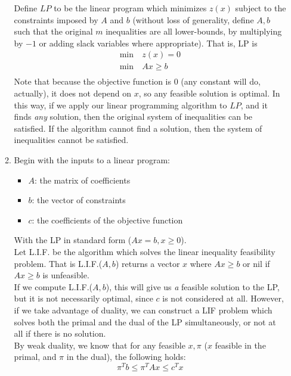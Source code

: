 \documentclass[12pt]{article}
\begin{document}
\begin{enumerate}
\begin{enumerate}
        Define $LP$ to be the linear program which minimizes $z(x)$ subject to
        the constraints imposed by $A$ and $b$ (without loss of generality,
        define $A,b$ such that the original $m$ inequalities are all
        lower-bounds, by multiplying by $-1$ or adding slack variables where
        appropriate). That is, LP is
        \begin{equation}
          \begin{split}
            \text{min}\ &z(x)=0\\
            \text{min}\ &Ax\geq b\\
          \end{split}
        \end{equation}
        Note that because the objective function is 0 (any constant will do,
        actually), it does not depend on $x$, so any feasible solution is
        optimal. In this way, if we apply our linear programming algorithm to
        $LP$, and it finds \textit{any} solution, then the original system of
        inequalities can be satisfied. If the algorithm cannot find a solution,
        then the system of inequalities cannot be satisfied.
      \item
        Begin with the inputs to a linear program:
          \begin{itemize}
            \item $A$: the matrix of coefficients
            \item $b$: the vector of constraints
            \item $c$: the coefficients of the objective function
          \end{itemize}
        With the LP in standard form ($Ax=b, x\geq0$).\\

        Let L.I.F. be the algorithm which solves the linear inequality
        feasibility problem. That is L.I.F.($A, b$) returns a vector $x$
        where $Ax\geq b$ or nil if $Ax\geq b$ is unfeasible.\\

        If we compute L.I.F.($A, b$), this will give us \textit{a} feasible
        solution to the LP, but it is not necessarily optimal, since $c$ is not
        considered at all. However, if we take advantage of duality, we can
        construct a LIF problem which solves both the primal and the dual of
        the LP simultaneously, or not at all if there is no solution.\\

        By weak duality, we know that for any feasible $x,\pi$ ($x$ feasible
        in the primal, and $\pi$ in the dual), the following holds:
        \begin{equation}
          \pi^Tb\leq\pi^TAx\leq c^Tx
        \end{equation}


\end{enumerate}
\end{enumerate}
\end{document}
